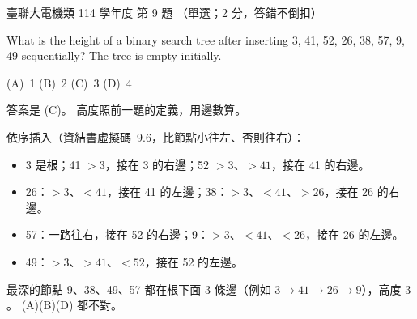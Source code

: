 \begin{pastexam}[label={px:ust-114-ee-ds-09}]{臺聯大電機類 114 學年度 第 9 題}
（單選；2 分，答錯不倒扣）

What is the height of a binary search tree after inserting 3, 41, 52, 26, 38, 57, 9, 49 sequentially?
The tree is empty initially.

(A)~1 \qquad (B)~2 \qquad (C)~3 \qquad (D)~4
\end{pastexam}

\begin{pastsoln}
答案是 (C)。 高度照前一題的定義，用邊數算。

依序插入（資結書虛擬碼~9.6，比節點小往左、否則往右）：
\begin{itemize}
\item 3 是根；41 $> 3$，接在 3 的右邊；52 $> 3$、$> 41$，接在 41 的右邊。
\item 26：$> 3$、$< 41$，接在 41 的左邊；38：$> 3$、$< 41$、$> 26$，接在 26 的右邊。
\item 57：一路往右，接在 52 的右邊；9：$> 3$、$< 41$、$< 26$，接在 26 的左邊。
\item 49：$> 3$、$> 41$、$< 52$，接在 52 的左邊。
\end{itemize}
\begin{center}
\end{center}
最深的節點 9、38、49、57 都在根下面 $3$ 條邊（例如 $3 \to 41 \to 26 \to 9$），高度 $3$。
(A)(B)(D) 都不對。
\end{pastsoln}
